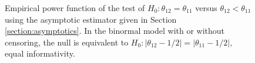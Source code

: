 \documentclass[12pt]{article}
\DeclareMathOperator{\AUC}{AUC}
\newcommand{\cind}{\perp \!\!\! \perp}
\newcommand{\aucindiv}{\theta_{11}}%
\newcommand{\aucpop}{\theta_{12}}%
\newcommand{\comment}[1]{
  \iftoggle{commenttoggle}{
    {\normalsize{\color{red}{ #1}}\normalsize}
  }
  {}
}
\begin{document}
\begin{figure}[!tbp]
  \centering
  \hfill
  \caption{Empirical power function of the test of $H_0:\aucpop=\aucindiv$ versus $\aucpop<\aucindiv$ using the
     asymptotic estimator given in Section
     \ref{section:asymptotics}. In the binormal model with or without censoring, the null is equivalent to $H_0:|\aucpop-1/2|=|\aucindiv-1/2|,$ equal informativity.}  \label{fig:power}
\end{figure}

\end{document}
